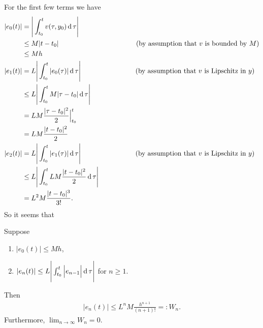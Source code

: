 For the first few terms we have
\begin{align*}
  |e_0(t)| &    = \Bigg|\int_{t_0}^t v(\tau, y_0) \operatorname{\text{d}}\tau\Bigg|\\
           & \leq M|t - t_0| ~~~~~~~~~~~~~~~~~~~~~~~~~~~~~~~~~~\text{(by assumption that $v$ is bounded by $M$)}\\
           & \leq Mh\\
  |e_1(t)| &    = L\Bigg|\int_{t_0}^t |e_0(\tau)| \operatorname{\text{d}}\tau\Bigg|  ~~~~~~~~~~~~~~~~~~~~~~~~\text{(by assumption that $v$ is Lipschitz in $y$)}\\
           & \leq L\Bigg|\int_{t_0}^t M|\tau - t_0| \operatorname{\text{d}}\tau\Bigg|\\
           &    = LM\frac{|\tau - t_0|^2}{2} \Big|_{t_0}^t \\
           &    = LM\frac{|t - t_0|^2}{2} \\
  |e_2(t)| &    = L\Bigg|\int_{t_0}^t |e_1(\tau)| \operatorname{\text{d}}\tau\Bigg|  ~~~~~~~~~~~~~~~~~~~~~~~~\text{(by assumption that $v$ is Lipschitz in $y$)}\\
           & \leq L\Bigg|\int_{t_0}^t LM\frac{|t - t_0|^2}{2} \operatorname{\text{d}}\tau\Bigg|\\
           &    = L^2M\frac{|t - t_0|^3}{3!}.
\end{align*}
So it seems that\\

\begin{lemma} \label{picard-convergence-induction}
Suppose
\begin{enumerate}
\item $|e_0(t)| \leq Mh$,
\item $|e_n(t)| \leq L\Bigg|\int_{t_0}^t \Big|e_{n-1}\Big| \operatorname{\text{d}}\tau \Bigg|$ for $n \geq 1$.
\end{enumerate}
Then
\begin{align*}
|e_n(t)| \leq L^nM\frac{h^{n+1}}{(n+1)!} =: W_n.
\end{align*}
Furthermore, $\lim_{n\to\infty}W_n = 0$.
\end{lemma}

